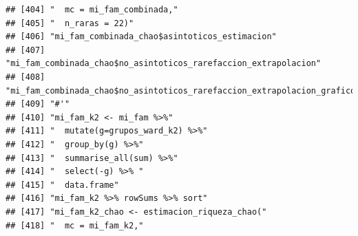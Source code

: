 \documentclass[11pt,]{article}
\begin{document}
\begin{verbatim}
## [404] "  mc = mi_fam_combinada,"                                                                                                                                              
## [405] "  n_raras = 22)"                                                                                                                                                       
## [406] "mi_fam_combinada_chao$asintoticos_estimacion"                                                                                                                          
## [407] "mi_fam_combinada_chao$no_asintoticos_rarefaccion_extrapolacion"                                                                                                        
## [408] "mi_fam_combinada_chao$no_asintoticos_rarefaccion_extrapolacion_grafico"                                                                                                
## [409] "#'"                                                                                                                                                                    
## [410] "mi_fam_k2 <- mi_fam %>%"                                                                                                                                               
## [411] "  mutate(g=grupos_ward_k2) %>%"                                                                                                                                        
## [412] "  group_by(g) %>%"                                                                                                                                                     
## [413] "  summarise_all(sum) %>%"                                                                                                                                              
## [414] "  select(-g) %>% "                                                                                                                                                     
## [415] "  data.frame"                                                                                                                                                          
## [416] "mi_fam_k2 %>% rowSums %>% sort"                                                                                                                                        
## [417] "mi_fam_k2_chao <- estimacion_riqueza_chao("                                                                                                                            
## [418] "  mc = mi_fam_k2,"                                                                                                                                                     

\end{verbatim}
\end{document}
